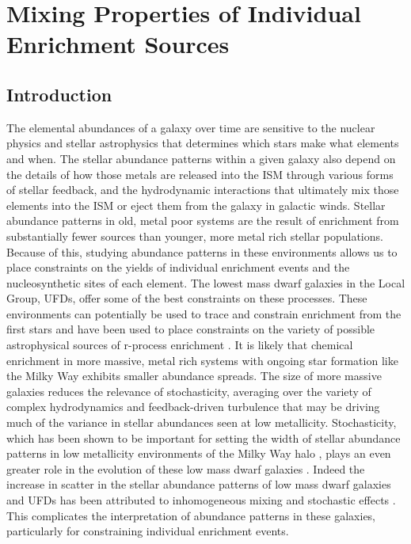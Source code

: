 \chapter[Mixing Properties of Individual Enrichment Sources]{Mixing Properties of Individual Enrichment Sources\label{ch:chapter4}}
\begingroup
\let\thefootnote\relax{}
\endgroup

%
%

\newcommand{\runone}{I\_}
\newcommand{\runonenu}{I}
\newcommand{\runtwo}{II\_}
\newcommand{\runtwonu}{II}

\section{Introduction}

The elemental abundances of a galaxy over time are sensitive to the nuclear physics and stellar astrophysics that determines which stars make what elements and when. The stellar abundance patterns within a given galaxy also depend on the details of how those metals are released into the ISM through various forms of stellar feedback, and the hydrodynamic interactions that ultimately mix those elements into the ISM or eject them from the galaxy in galactic winds. Stellar abundance patterns in old, metal poor systems are the result of enrichment from substantially fewer sources than younger, more metal rich stellar populations. Because of this, studying abundance patterns in these environments allows us to place constraints on the yields of individual enrichment events and the nucleosynthetic sites of each element. The lowest mass dwarf galaxies in the Local Group, UFDs, offer some of the best constraints on these processes. These environments can potentially be used to trace and constrain enrichment from the first stars \citep[e.g.][]{FrebelBromm2012,Ji2015,Ritter2015,Jeon2017,Hartwig2018} and have been used to place constraints on the variety of possible astrophysical sources of r-process enrichment \citep[e.g.][]{Ji2016a,Ji2016b,Ji2018a,Ji2019,Tsujimoto2017,Duggan2018,Nagasawa2018,Ojima2018}. It is likely that chemical enrichment in more massive, metal rich systems with ongoing star formation like the Milky Way exhibits smaller abundance spreads. The size of more massive galaxies reduces the relevance of stochasticity, averaging over the variety of complex hydrodynamics and feedback-driven turbulence that may be driving much of the variance in stellar abundances seen at low metallicity. Stochasticity, which has been shown to be important for setting the width of stellar abundance patterns in low metallicity environments of the Milky Way halo \citep[e.g.][]{Cescutti2008,Cescutti2014}, plays an even greater role in the evolution of these low mass dwarf galaxies \citep{Applebaum2018}. Indeed the increase in scatter in the stellar abundance patterns of low mass dwarf galaxies and UFDs has been attributed to inhomogeneous mixing and stochastic effects \citep[e.g.][]{Norris2010a,Lee2013,Simon2015,Mashonkina2017,Suda2017}. This complicates the interpretation of abundance patterns in these galaxies, particularly for constraining individual enrichment events.

